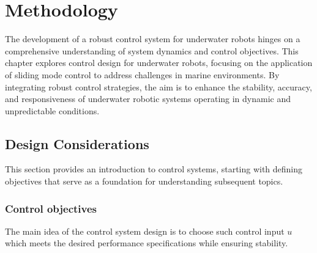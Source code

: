 \chapter{Methodology}
\label{chap:ctrl}





    The development of a robust control system for underwater robots hinges on a 
    comprehensive understanding of system dynamics and control objectives.
    This chapter explores control design for underwater robots, focusing on the application 
    of sliding mode control to address challenges in marine environments. By integrating 
    robust control strategies, the aim is to enhance the stability, accuracy, and 
    responsiveness of underwater robotic systems operating in dynamic and unpredictable conditions.

\section{Design Considerations}

    This section provides an introduction to control systems, starting with defining objectives 
    that serve as a foundation for understanding subsequent topics.

    \subsection{Control objectives}

    The main idea of the control system design is to choose such control input $u$ which 
    meets the desired performance specifications while ensuring stability.

